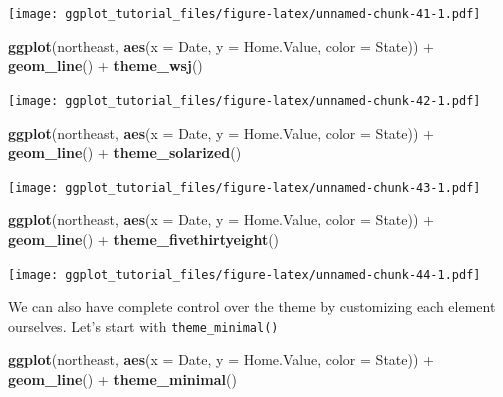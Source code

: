 \documentclass[]{article}
\newenvironment{Shaded}{\begin{snugshade}}{\end{snugshade}}
\newcommand{\KeywordTok}[1]{\textcolor[rgb]{0.13,0.29,0.53}{\textbf{{#1}}}}
\newcommand{\DataTypeTok}[1]{\textcolor[rgb]{0.13,0.29,0.53}{{#1}}}
\newcommand{\StringTok}[1]{\textcolor[rgb]{0.31,0.60,0.02}{{#1}}}
\newcommand{\NormalTok}[1]{{#1}}
\theoremstyle{definition}
\theoremstyle{definition}
\theoremstyle{definition}
\theoremstyle{remark}
\begin{document}
\texttt{[image: ggplot\_tutorial\_files/figure-latex/unnamed-chunk-41-1.pdf]}

\begin{Shaded}
\begin{Highlighting}[]
\KeywordTok{ggplot}\NormalTok{(northeast, }\KeywordTok{aes}\NormalTok{(}\DataTypeTok{x =} \NormalTok{Date, }\DataTypeTok{y =} \NormalTok{Home.Value, }\DataTypeTok{color =} \NormalTok{State)) +}
\StringTok{  }\KeywordTok{geom_line}\NormalTok{() +}
\StringTok{  }\KeywordTok{theme_wsj}\NormalTok{()}
\end{Highlighting}
\end{Shaded}

\texttt{[image: ggplot\_tutorial\_files/figure-latex/unnamed-chunk-42-1.pdf]}

\begin{Shaded}
\begin{Highlighting}[]
\KeywordTok{ggplot}\NormalTok{(northeast, }\KeywordTok{aes}\NormalTok{(}\DataTypeTok{x =} \NormalTok{Date, }\DataTypeTok{y =} \NormalTok{Home.Value, }\DataTypeTok{color =} \NormalTok{State)) +}
\StringTok{  }\KeywordTok{geom_line}\NormalTok{() +}
\StringTok{  }\KeywordTok{theme_solarized}\NormalTok{()}
\end{Highlighting}
\end{Shaded}

\texttt{[image: ggplot\_tutorial\_files/figure-latex/unnamed-chunk-43-1.pdf]}

\begin{Shaded}
\begin{Highlighting}[]
\KeywordTok{ggplot}\NormalTok{(northeast, }\KeywordTok{aes}\NormalTok{(}\DataTypeTok{x =} \NormalTok{Date, }\DataTypeTok{y =} \NormalTok{Home.Value, }\DataTypeTok{color =} \NormalTok{State)) +}
\StringTok{  }\KeywordTok{geom_line}\NormalTok{() +}
\StringTok{  }\KeywordTok{theme_fivethirtyeight}\NormalTok{()}
\end{Highlighting}
\end{Shaded}

\texttt{[image: ggplot\_tutorial\_files/figure-latex/unnamed-chunk-44-1.pdf]}

We can also have complete control over the theme by customizing each
element ourselves. Let's start with \texttt{theme\_minimal()}

\begin{Shaded}
\begin{Highlighting}[]
\KeywordTok{ggplot}\NormalTok{(northeast, }\KeywordTok{aes}\NormalTok{(}\DataTypeTok{x =} \NormalTok{Date, }\DataTypeTok{y =} \NormalTok{Home.Value, }\DataTypeTok{color =} \NormalTok{State)) +}
\StringTok{  }\KeywordTok{geom_line}\NormalTok{() +}
\StringTok{  }\KeywordTok{theme_minimal}\NormalTok{()}
\end{Highlighting}
\end{Shaded}
\end{document}
